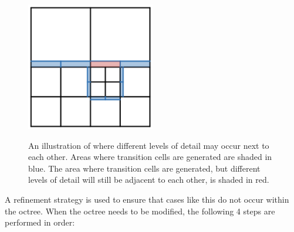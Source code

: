 \documentclass[11pt]{article}
\begin{document}
\begin{figure}
  \caption{An illustration of where different levels of detail may occur next to each other. Areas where transition cells are generated are shaded in blue. The area where transition cells are generated, but different levels of detail will still be adjacent to each other, is shaded in red.}
  \includegraphics[width=0.5\textwidth]{octree_neighbor_error.png}
  \label{fig:octree_neighbor_error}
\end{figure}
A refinement strategy is used to ensure that cases like this do not occur within the octree. When the octree needs to be modified, the following 4 steps are performed in order:
\end{document}

